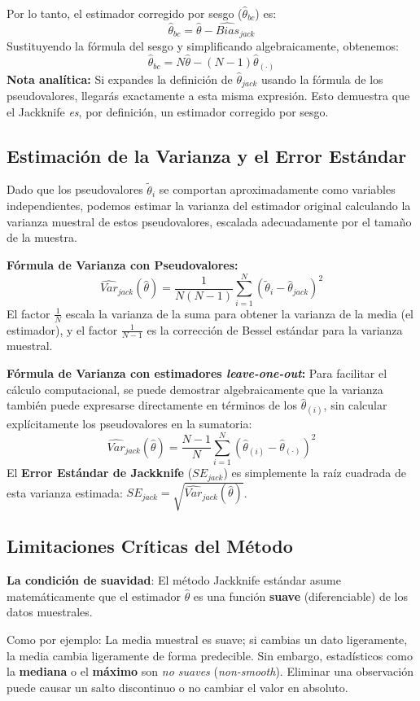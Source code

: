 \documentclass[a4paper]{article}
\begin{document}
Por lo tanto, el estimador corregido por sesgo ($\hat{\theta}_{bc}$) es:
$$ \hat{\theta}_{bc} = \hat{\theta} - \widehat{Bias}_{jack} $$
Sustituyendo la fórmula del sesgo y simplificando algebraicamente, obtenemos:
$$ \hat{\theta}_{bc} = N\hat{\theta} - (N-1)\hat{\theta}_{(\cdot)} $$
\textbf{Nota analítica:} Si expandes la definición de $\hat{\theta}_{jack}$ usando la fórmula de los pseudovalores, llegarás exactamente a esta misma expresión. Esto demuestra que el Jackknife \textit{es}, por definición, un estimador corregido por sesgo.

\subsection{Estimación de la Varianza y el Error Estándar}
Dado que los pseudovalores $\tilde{\theta}_i$ se comportan aproximadamente como variables independientes, podemos estimar la varianza del estimador original calculando la varianza muestral de estos pseudovalores, escalada adecuadamente por el tamaño de la muestra.

\textbf{Fórmula de Varianza con Pseudovalores:}
$$ \widehat{Var}_{jack}(\hat{\theta}) = \frac{1}{N(N-1)} \sum_{i=1}^N (\tilde{\theta}_i - \hat{\theta}_{jack})^2 $$
El factor $\frac{1}{N}$ escala la varianza de la suma para obtener la varianza de la media (el estimador), y el factor $\frac{1}{N-1}$ es la corrección de Bessel estándar para la varianza muestral.

\textbf{Fórmula de Varianza con estimadores \textit{leave-one-out}:} Para facilitar el cálculo computacional, se puede demostrar algebraicamente que la varianza también puede expresarse directamente en términos de los $\hat{\theta}_{(i)}$, sin calcular explícitamente los pseudovalores en la sumatoria:
$$ \widehat{Var}_{jack}(\hat{\theta}) = \frac{N-1}{N} \sum_{i=1}^N (\hat{\theta}_{(i)} - \hat{\theta}_{(\cdot)})^2 $$
El \textbf{Error Estándar de Jackknife} ($SE_{jack}$) es simplemente la raíz cuadrada de esta varianza estimada: $SE_{jack} = \sqrt{\widehat{Var}_{jack}(\hat{\theta})}$.

\subsection{Limitaciones Críticas del Método}
\textbf{La condición de suavidad}: El método Jackknife estándar asume matemáticamente que el estimador $\hat{\theta}$ es una función \textbf{suave} (diferenciable) de los datos muestrales. 

Como por ejemplo: La media muestral es suave; si cambias un dato ligeramente, la media cambia ligeramente de forma predecible. Sin embargo, estadísticos como la \textbf{mediana} o el \textbf{máximo} son \textit{no suaves} (\textit{non-smooth}). Eliminar una observación puede causar un salto discontinuo o no cambiar el valor en absoluto. 
\end{document}
